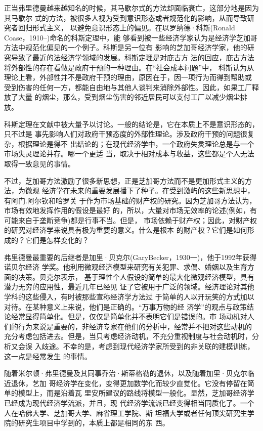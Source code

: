 正当弗里德曼越来越知名的时候，其马歇尔式的方法却面临衰亡，这部分地是因为其马歇尔
式的方法，被很多人视为受到意识形态或者规范化的影响，从而导致研究者回归形式主义，
以避免意识形态上的偏见。在以罗纳德·科斯(Ronald Coase，1910--)命名的科斯定理中，能
够看到被一些经济学家认为是经济学芝加哥方法中规范化偏见的一个例子。科斯是另一位有
影响的芝加哥经济学家，他的研究导致了最近的法经济学领域的发展。科斯定理是对庇古方
法的回应，庇古方法将外部性的存在看做是政府干预的一种理由。在“社会成本问题”中，
科斯认为从理论上看，外部性并不是政府干预的理由，原因在于，因一项行为而得到帮助或
受到伤害的任何一方，都能自由地与其他人谈判来消除外部性。因此，如果工厂释放了大量
的烟尘，那么，受到烟尘伤害的邻近居民可以支付工厂以减少烟尘排放。

科斯定理在文献中被大量予以讨论。一般的结论是，它在本质上不是意识形态的，只不过是
事先影响人们对政府干预态度的外部性理论。涉及政府干预的问题很复杂，根据理论是得不
出结论的；在现代经济学中，一个政府失灵理论总是与一个市场失灵理论并存。哪一个更适
当，取决于相对成本与收益，这些都是个人无法取得一致意见的事情。

不过，芝加哥方法激励了很多新思想，正是芝加哥方法而不是更加形式主义的方法，为微观
经济学在未来的重要发展播下了种子。在受到激屿的这些新思想中，有阿门.阿尔钦和哈罗关
于作为市场基础的财产权的研究。因为芝加哥方法认为，市场有效地发挥作用的假设是最好
的，所以，大量对市场无效率的论述(例如，有可能来自于垄断竞争)都是行事不当。但是，
市场依赖于财产权；因此，对财产权的研究对经济学来说具有极为重要的意义。什么是根本
的财产权？它们是如何形成的？它们是怎样变化的？

弗里德曼最重要的后继者是加里·贝克尔(GaryBecker，1930一)，他于1992年获得诺贝尔经济
学奖。他利用微观经济模型来研究有关犯罪、求偶、婚姻以及生育方面的决策。贝克尔表示，
基于理性个人假设的简单的最大化微观经济模型，具有潜力无穷的应用性，最近几年已经见
证了它被用于广泛的领域。经济理论对其他学科的这些侵入，有时被那些宣称经济学方法过
于简单的人以开玩笑的方式加以对待。在某种意义上来说，他们是正确的。“万事万物的经
济学”的观点与政策结论经常显得简单化。但是，仅仅是简单化并不表明它们是错误的。市
场动机对人们的行为来说是重要的，非经济专家在他们的分析中，经常并不把对这些动机的
充分考虑包括进去。但是，当只考虑经济动机，不充分重视制度与社会动机时，分析又会误
入歧途。不幸的是，考虑到现代经济学家所受到的非关联的建模训练，这一点是经常发生
的事情。

随着米尔顿·弗里德曼及其同事乔治·斯蒂格勒的退休，以及随着加里·贝克尔临近退休，艺加
哥经济学在变化，变得更加数学化而较少直觉化。它没有停留在简单的模型上，而是沿着瓦
里安所建议的路线将模型一般化。显然，芝加哥经济学已经成为现代经济学流派，并且，现
代经济学流派已经变得相当同质化了。一个人在哈佛大学、芝加哥大学、麻省理工学院、斯
坦福大学或者任何顶尖研究生学院的研究生项目中学到的，本质上都是相同的东
西。


